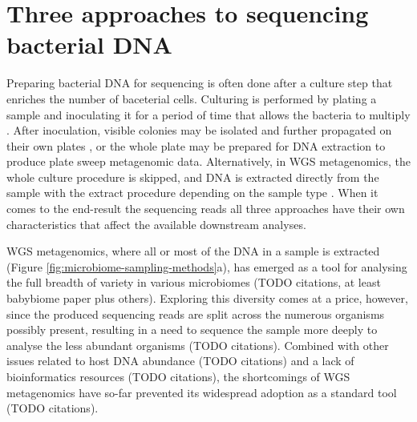 \documentclass[officiallayout]{tktla}
\begin{document}
\section{Three approaches to sequencing bacterial DNA}
\label{three-approaches-to-metagenomics}


Preparing bacterial DNA for sequencing is often done after a
culture step that enriches the number of baceterial cells. Culturing
is performed by plating a sample and inoculating it for a period of
time that allows the bacteria to multiply
\citep{sanders2012aseptic}. After inoculation, visible colonies may be
isolated and further propagated on their own plates
\citep{sanders2012aseptic}, or the whole plate may be prepared for DNA
extraction to produce plate sweep metagenomic data. Alternatively, in
WGS metagenomics, the whole culture procedure is skipped, and DNA is
extracted directly from the sample with the extract procedure
depending on the sample type \citep{bachmann2018advances}. When it
comes to the end-result \textemdash the sequencing reads \textemdash
all three approaches have their own characteristics that affect the
available downstream analyses.


WGS metagenomics, where all or most of the DNA in a sample is
extracted (Figure \ref{fig:microbiome-sampling-methods}a), has emerged
as a tool for analysing the full breadth of variety in various
microbiomes (TODO citations, at least babybiome paper plus
others). Exploring this diversity comes at a price, however, since the
produced sequencing reads are split across the numerous organisms
possibly present, resulting in a need to sequence the sample more
deeply to analyse the less abundant organisms (TODO
citations). Combined with other issues related to host DNA abundance
(TODO citations) and a lack of bioinformatics resources (TODO
citations), the shortcomings of WGS metagenomics have so-far prevented
its widespread adoption as a standard tool (TODO citations).
\end{document}
